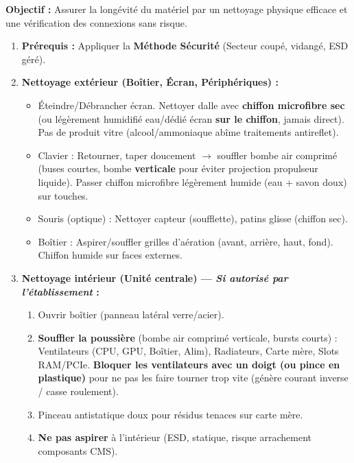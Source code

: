 \documentclass[11pt]{article}
\begin{document}
\begin{methode}
    \textbf{Objectif :} Assurer la longévité du matériel par un nettoyage physique efficace et une vérification des connexions sans risque.
    \begin{enumerate}
        \item \textbf{Prérequis :} Appliquer la \textbf{Méthode Sécurité} (Secteur coupé, vidangé, ESD géré).
        \item \textbf{Nettoyage extérieur (Boîtier, Écran, Périphériques) :}
              \begin{itemize}
                  \item Éteindre/Débrancher écran. Nettoyer dalle avec \textbf{chiffon microfibre sec} (ou légèrement humidifié eau/dédié écran \textbf{sur le chiffon}, jamais direct). Pas de produit vitre (alcool/ammoniaque abîme traitements antireflet).
                  \item Clavier : Retourner, taper doucement $\rightarrow$ souffler bombe air comprimé (buses courtes, bombe \textbf{verticale} pour éviter projection propulseur liquide). Passer chiffon microfibre légèrement humide (eau + savon doux) sur touches.
                  \item Souris (optique) : Nettoyer capteur (soufflette), patins glisse (chiffon sec).
                  \item Boîtier : Aspirer/souffler grilles d'aération (avant, arrière, haut, fond). Chiffon humide sur faces externes.
              \end{itemize}
        \item \textbf{Nettoyage intérieur (Unité centrale) — \emph{Si autorisé par l'établissement} :}
              \begin{enumerate}
                  \item Ouvrir boîtier (panneau latéral verre/acier).
                  \item \textbf{Souffler la poussière} (bombe air comprimé verticale, bursts courts) : Ventilateurs (CPU, GPU, Boîtier, Alim), Radiateurs, Carte mère, Slots RAM/PCIe. \textbf{Bloquer les ventilateurs avec un doigt (ou pince en plastique)} pour ne pas les faire tourner trop vite (génère courant inverse / casse roulement).
                  \item Pinceau antistatique doux pour résidus tenaces sur carte mère.
                  \item \textbf{Ne pas aspirer} à l'intérieur (ESD, statique, risque arrachement composants CMS).

\end{enumerate}
\end{enumerate}
\end{methode}
\end{document}
